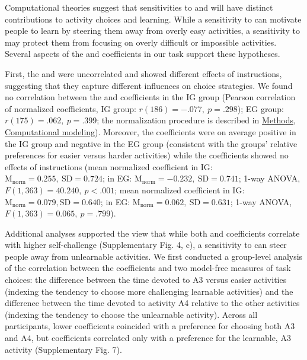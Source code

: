     Computational theories suggest that sensitivities to {\PC} and {\LP} will have distinct contributions to activity choices and learning. While a sensitivity to {\PC} can motivate people to learn by steering them away from overly easy activities, a sensitivity to {\LP} may protect them from focusing on overly difficult or impossible activities. Several aspects of the {\wPC} and {\wLP} coefficients in our task support these hypotheses.
    
    First, the {\wPC} and {\wLP} were uncorrelated and showed different effects of instructions, suggesting that they capture different influences on choice strategies. We found no correlation between the {\wPC} and {\wLP} coefficients in the IG group (Pearson correlation of normalized coefficients, IG group: $r(186) = -.077,\ p = .298$); EG group: $r(175) = .062,\ p = .399$; the normalization procedure is described in \hyperref[subsubsec:methods/analysis/modeling]{Methods, Computational modeling}). Moreover, the {\PC} coefficients were on average positive in the IG group and negative in the EG group (consistent with the groups' relative preferences for easier versus harder activities) while the {\LP} coefficients showed no effects of instructions (mean normalized {\PC} coefficient in IG: $\text{M}_{\text{norm}} = 0.255,\ \text{SD} = 0.724$; in EG: $\text{M}_{\text{norm}} = -0.232,\ \text{SD} = 0.741$; 1-way ANOVA, $F(1, 363) = 40.240,\ p < .001$; mean normalized {\LP} coefficient in IG: $\text{M}_{\text{norm}} = 0.079, \text{SD} = 0.640$; in EG: $\text{M}_{\text{norm}} = 0.062,\ \text{SD} = 0.631$; 1-way ANOVA, $F(1, 363) = 0.065,\ p = .799$).
    
    Additional analyses supported the view that while both {\PC} and {\LP} coefficients correlate with higher self-challenge (Supplementary Fig. 4, c), a sensitivity to {\LP} can steer people away from unlearnable activities. We first conducted a group-level analysis of the correlation between the coefficients and two model-free measures of task choices: the difference between the time devoted to A3 versus easier activities (indexing the tendency to choose more challenging learnable activities) and the difference between the time devoted to activity A4 relative to the other activities (indexing the tendency to choose the unlearnable activity). Across all participants, lower {\PC} coefficients coincided with a preference for choosing both A3 and A4, but {\nLP} coefficients correlated only with a preference for the learnable, A3 activity (Supplementary Fig. 7).
    
